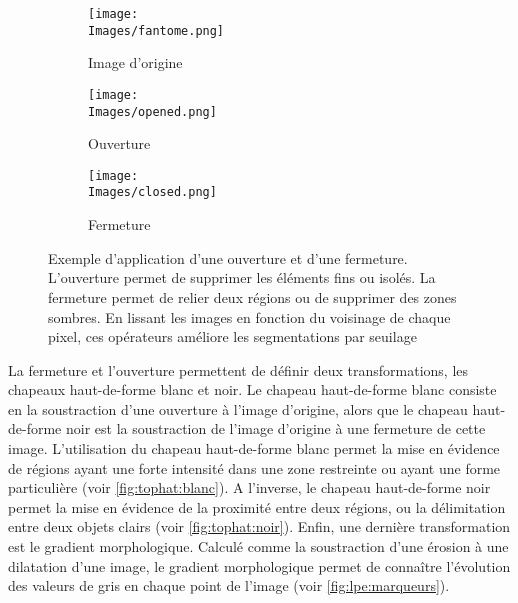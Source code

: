 \documentclass[\main/main.tex]{subfiles}
\providecommand{\Images}{\main/Figures/intro_seg}
\begin{document}
\begin{figure}[h!]
    \centering
    \begin{subfigure}[b]{0.30\textwidth}
       \caption{
       Image d'origine
            }
       \centering \texttt{[image: \\Images/fantome.png]}
    \end{subfigure}
    \begin{subfigure}[b]{0.30\textwidth}
       \caption{
        \label{fig:ouverture}
            Ouverture
            }
       \centering \texttt{[image: \\Images/opened.png]}
    \end{subfigure}
    \begin{subfigure}[b]{0.30\textwidth}
       \caption{
        \label{fig:fermeture}
            Fermeture
            }
       \centering \texttt{[image: \\Images/closed.png]}
    \end{subfigure}
    \caption{
        Exemple d'application d'une ouverture et d'une fermeture.
        \newline
        L'ouverture permet de supprimer les éléments fins ou isolés.
        La fermeture permet de relier deux régions ou de supprimer des zones sombres.
        En lissant les images en fonction du voisinage de chaque pixel, ces opérateurs améliore les segmentations par seuilage
    }
    
\end{figure}
%
La fermeture et l'ouverture permettent de définir deux transformations, les chapeaux haut-de-forme blanc et noir.
%
Le chapeau haut-de-forme blanc consiste en la soustraction d'une ouverture à l'image d'origine, alors que le chapeau haut-de-forme noir est la soustraction de l'image d'origine à une fermeture de cette image.
%
L'utilisation du chapeau haut-de-forme blanc permet la mise en évidence de régions ayant une forte intensité dans une zone restreinte ou ayant une forme particulière (voir \autoref{fig:tophat:blanc}).
%
A l'inverse, le chapeau haut-de-forme noir permet la mise en évidence de la proximité entre deux régions, ou la délimitation entre deux objets clairs (voir \autoref{fig:tophat:noir}).
%
Enfin, une dernière transformation est le gradient morphologique.
%
Calculé comme la soustraction d'une érosion à une dilatation d'une image,
le gradient morphologique permet de connaître l'évolution des valeurs de gris en chaque point de l'image (voir \autoref{fig:lpe:marqueurs}).
\end{document}
